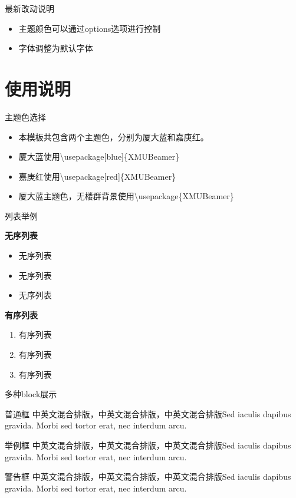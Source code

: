 \documentclass{beamer}
\begin{document}
\begin{frame}{最新改动说明}
    \begin{itemize}
        \item 主题颜色可以通过options选项进行控制
        \item 字体调整为默认字体
    \end{itemize}
\end{frame}
\section{使用说明}
\begin{frame}{主题色选择}
	\begin{itemize}
		\item 本模板共包含两个主题色，分别为厦大蓝和嘉庚红。
		\item 厦大蓝使用\textbackslash usepackage[blue]\{XMUBeamer\}
		\item 嘉庚红使用\textbackslash usepackage[red]\{XMUBeamer\}
		\item 厦大蓝主题色，无楼群背景使用\textbackslash usepackage\{XMUBeamer\}
	\end{itemize}
	
	
\end{frame}

\begin{frame}{列表举例}
	\begin{block}{\textbf{无序列表}}
		\begin{itemize}
			\item 无序列表
			\item 无序列表
			\item 无序列表
		\end{itemize}
	\end{block}
	
	\begin{block}{\textbf{有序列表}}
		\begin{enumerate}
			\item 有序列表
			\item 有序列表
			\item 有序列表
		\end{enumerate}
	\end{block}
\end{frame}

\begin{frame}{多种block展示}
	\begin{block}{普通框}
		中英文混合排版，中英文混合排版，中英文混合排版Sed iaculis
		dapibus gravida. Morbi sed tortor erat, nec interdum arcu. 
	\end{block}
	\begin{exampleblock}{举例框}
		中英文混合排版，中英文混合排版，中英文混合排版Sed iaculis
		dapibus gravida. Morbi sed tortor erat, nec interdum arcu.
	\end{exampleblock}
	\begin{alertblock}{警告框}
		中英文混合排版，中英文混合排版，中英文混合排版Sed iaculis
		dapibus gravida. Morbi sed tortor erat, nec interdum arcu.
	\end{alertblock}
\end{frame}
\end{document}
